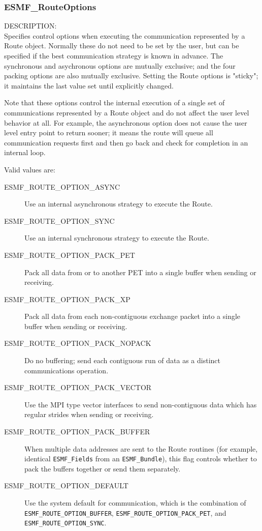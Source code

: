 
\subsubsection{ESMF\_RouteOptions}

\label{opt:routeopt}
{\sf DESCRIPTION:\\}
Specifies control options when executing the communication
represented by a Route object.  Normally these do not need to
be set by the user, but can be specified if the best communication strategy
is known in advance.   The synchronous and asychronous options 
are mutually exclusive; and the four packing options are also
mutually exclusive.  Setting the Route options is "sticky"; it
maintains the last value set until explicitly changed.

Note that these options control the internal execution of a single
set of communications represented by a Route object and do not affect
the user level behavior at all.  For example,
the asynchronous option does not cause the user level entry point to
return sooner; it means the route will queue all communication requests
first and then go back and check for completion in an internal loop.

Valid values are:
\begin{description}
    \item [ESMF\_ROUTE\_OPTION\_ASYNC]
	Use an internal asynchronous strategy to execute the Route.
    \item [ESMF\_ROUTE\_OPTION\_SYNC]
	Use an internal synchronous strategy to execute the Route.
    \item [ESMF\_ROUTE\_OPTION\_PACK\_PET]
        Pack all data from or to another PET into a single buffer
        when sending or receiving.
    \item [ESMF\_ROUTE\_OPTION\_PACK\_XP]
        Pack all data from each non-contiguous exchange packet 
        into a single buffer when sending or receiving.
    \item [ESMF\_ROUTE\_OPTION\_PACK\_NOPACK]
        Do no buffering; send each contiguous run of data as a distinct
        communications operation.
    \item [ESMF\_ROUTE\_OPTION\_PACK\_VECTOR]
        Use the MPI type vector interfaces to send non-contiguous data
        which has regular strides when sending or receiving.
    \item [ESMF\_ROUTE\_OPTION\_PACK\_BUFFER]
        When multiple data addresses are sent to the Route routines (for
        example, identical {\tt ESMF\_Fields} from an {\tt ESMF\_Bundle}),
        this flag controls whether to pack the buffers together or send
        them separately.  
    \item [ESMF\_ROUTE\_OPTION\_DEFAULT]
	Use the system default for communication, which is the combination of 
        {\tt ESMF\_ROUTE\_OPTION\_BUFFER},
        {\tt ESMF\_ROUTE\_OPTION\_PACK\_PET}, and
        {\tt ESMF\_ROUTE\_OPTION\_SYNC}.
\end{description}







